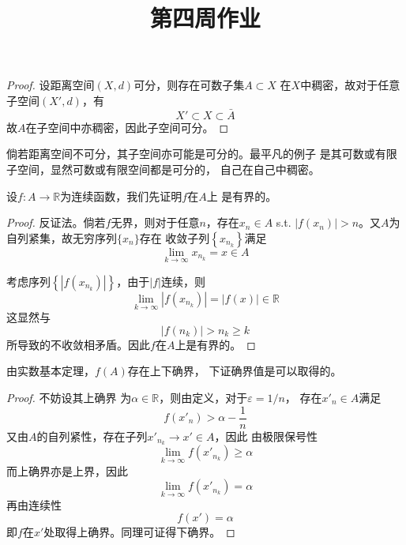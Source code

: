 \documentclass[cn]{homework}
\title{第四周作业}
\begin{document}
    \maketitle

    \problem
    \begin{proof}
        设距离空间$(X,d)$可分，则存在可数子集$A\subset X$
        在$X$中稠密，故对于任意子空间$(X',d)$，有
        \[X'\subset X\subset\bar A\]
        故$A$在子空间中亦稠密，因此子空间可分。
    \end{proof}

    倘若距离空间不可分，其子空间亦可能是可分的。最平凡的例子
    是其可数或有限子空间，显然可数或有限空间都是可分的，
    自己在自己中稠密。

    \problem
    设$f:A\to\mathbb R$为连续函数，我们先证明$f$在$A$上
    是有界的。
    \begin{proof}
        反证法。倘若$f$无界，则对于任意$n$，存在$x_n\in A$ s.t.
        $|f(x_n)|>n$。又$A$为自列紧集，故无穷序列$\{x_n\}$存在
        收敛子列$\left\{x_{n_k}\right\}$满足
        \[\lim_{k\to\infty}x_{n_k}=x\in A\]

        考虑序列$\left\{|f(x_{n_k})|\right\}$，由于$|f|$连续，则
        \[\lim_{k\to\infty}|f(x_{n_k})|=|f(x)|\in\mathbb R\]
        这显然与
        \[|f(n_k)|>n_k\geq k\]
        所导致的不收敛相矛盾。因此$f$在$A$上是有界的。
    \end{proof}

    由实数基本定理，$f(A)$存在上下确界，
    下证确界值是可以取得的。
    \begin{proof}
        不妨设其上确界
        为$\alpha\in\mathbb R$，则由定义，对于$\varepsilon=1/n$，
        存在$x'_n\in A$满足
        \[f(x'_n)>\alpha-\frac{1}{n}\]
        又由$A$的自列紧性，存在子列$x'_{n_k}\to x'\in A$，因此
        由极限保号性
        \[\lim_{k\to\infty}f(x'_{n_k})\geq \alpha\]
        而上确界亦是上界，因此
        \[\lim_{k\to\infty}f(x'_{n_k})=\alpha\]
        再由连续性
        \[f(x')=\alpha\]
        即$f$在$x'$处取得上确界。同理可证得下确界。
    \end{proof}
\end{document}
